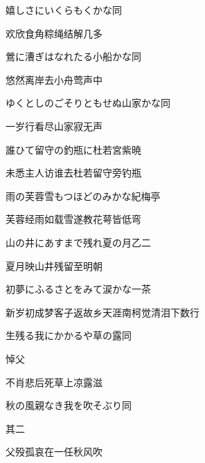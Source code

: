 \begin{haiku}
    {\FH 嬉しさにいくらもくかな}\hfill{\FH 同}

    {\FK 欢欣食角粽绳结解几多}
\end{haiku}

\begin{haiku}
    {\FH 鶯に漕ぎはなれたる小船かな}\hfill{\FH 同}

    {\FK 悠然离岸去小舟莺声中}
\end{haiku}

\begin{haiku}
    {\FH ゆくとしのごそりともせぬ山家かな}\hfill{\FH 同}

    {\FK 一岁行看尽山家寂无声}
\end{haiku}

\begin{haiku}
    {\FH 誰ひて留守の釣瓶に杜若}\hfill{\FH 宮紫暁}

    {\FK 未悉主人访谁去杜若留守旁钓瓶}
\end{haiku}

\begin{haiku}
    {\FH 雨の芙蓉雪もつほどのみかな}\hfill{\FH 紀梅亭}

    {\FK 芙蓉经雨如载雪遂教花萼皆低弯}
\end{haiku}

\begin{haiku}
    {\FH 山の井にあすまで残れ夏の月}\hfill{\FH 乙二}

    {\FK 夏月映山井残留至明朝}
\end{haiku}

\begin{haiku}
    {\FH 初夢にふるさとをみて涙かな}\hfill{\FH 一茶}

    {\FK 新岁初成梦客子返故乡天涯南柯觉清泪下数行}
\end{haiku}

\begin{haiku}
    {\FH 生残る我にかかるや草の露}\hfill{\FH 同}

    {\FK 悼父}

    {\FK 不肖悲后死草上凉露滋}
\end{haiku}

\begin{haiku}
    {\FH 秋の風親なき我を吹そぶり}\hfill{\FH 同}

    {\FK 其二}

    {\FK 父殁孤哀在一任秋风吹}
\end{haiku}

